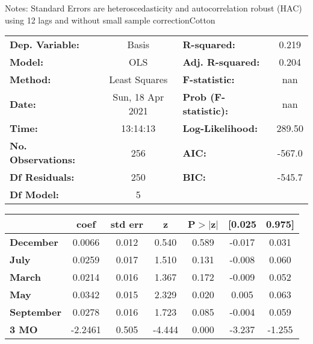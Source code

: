 Notes: \newline
 [1] Standard Errors are heteroscedasticity and autocorrelation robust (HAC) using 12 lags and without small sample correctionCotton\begin{center}
\begin{tabular}{lclc}
\toprule
\textbf{Dep. Variable:}    &      Basis       & \textbf{  R-squared:         } &     0.219   \\
\textbf{Model:}            &       OLS        & \textbf{  Adj. R-squared:    } &     0.204   \\
\textbf{Method:}           &  Least Squares   & \textbf{  F-statistic:       } &       nan   \\
\textbf{Date:}             & Sun, 18 Apr 2021 & \textbf{  Prob (F-statistic):} &      nan    \\
\textbf{Time:}             &     13:14:13     & \textbf{  Log-Likelihood:    } &    289.50   \\
\textbf{No. Observations:} &         256      & \textbf{  AIC:               } &    -567.0   \\
\textbf{Df Residuals:}     &         250      & \textbf{  BIC:               } &    -545.7   \\
\textbf{Df Model:}         &           5      & \textbf{                     } &             \\
\bottomrule
\end{tabular}
\begin{tabular}{lcccccc}
                   & \textbf{coef} & \textbf{std err} & \textbf{z} & \textbf{P$> |$z$|$} & \textbf{[0.025} & \textbf{0.975]}  \\
\midrule
\textbf{December}  &       0.0066  &        0.012     &     0.540  &         0.589        &       -0.017    &        0.031     \\
\textbf{July}      &       0.0259  &        0.017     &     1.510  &         0.131        &       -0.008    &        0.060     \\
\textbf{March}     &       0.0214  &        0.016     &     1.367  &         0.172        &       -0.009    &        0.052     \\
\textbf{May}       &       0.0342  &        0.015     &     2.329  &         0.020        &        0.005    &        0.063     \\
\textbf{September} &       0.0278  &        0.016     &     1.723  &         0.085        &       -0.004    &        0.059     \\
\textbf{3 MO}      &      -2.2461  &        0.505     &    -4.444  &         0.000        &       -3.237    &       -1.255     \\

\end{tabular}
\end{center}
